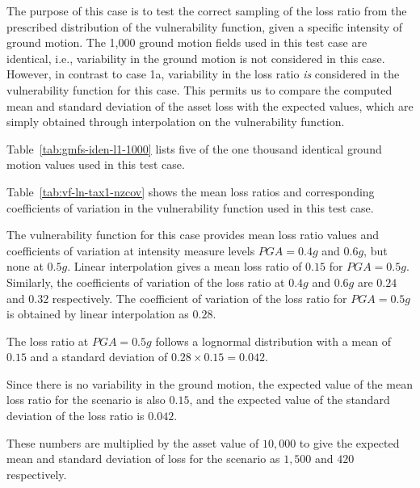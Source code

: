 The purpose of this case is to test the correct sampling of the loss ratio from the prescribed distribution of the vulnerability function, given a specific intensity of ground motion. The 1,000 ground motion fields used in this test case are identical, i.e., variability in the ground motion is not considered in this case. However, in contrast to case 1a, variability in the loss ratio \emph{is} considered in the vulnerability function for this case. This permits us to compare the computed mean and standard deviation of the asset loss with the expected values, which are simply obtained through interpolation on the vulnerability function.



Table~\ref{tab:gmfs-iden-l1-1000} lists five of the one thousand identical ground motion values used in this test case.



Table~\ref{tab:vf-ln-tax1-nzcov} shows the mean loss ratios and corresponding coefficients of variation in the vulnerability function used in this test case.

The vulnerability function for this case provides mean loss ratio values and coefficients of variation at intensity measure levels $PGA = 0.4 g$ and $0.6 g$, but none at $0.5 g$. Linear interpolation gives a mean loss ratio of $0.15$ for $PGA = 0.5 g$. Similarly, the coefficients of variation of the loss ratio at $0.4 g$ and $0.6 g$ are $0.24$ and $0.32$ respectively. The coefficient of variation of the loss ratio for $PGA = 0.5 g$ is obtained by linear interpolation as $0.28$.

The loss ratio at $PGA = 0.5 g$ follows a lognormal distribution with a mean of $0.15$ and a standard deviation of $0.28 \times 0.15 = 0.042$.

Since there is no variability in the ground motion, the expected value of the mean loss ratio for the scenario is also $0.15$, and the expected value of the standard deviation of the loss ratio is $0.042$.

These numbers are multiplied by the asset value of $10,000$ to give the expected mean and standard deviation of loss for the scenario as $1,500$ and $420$ respectively.

